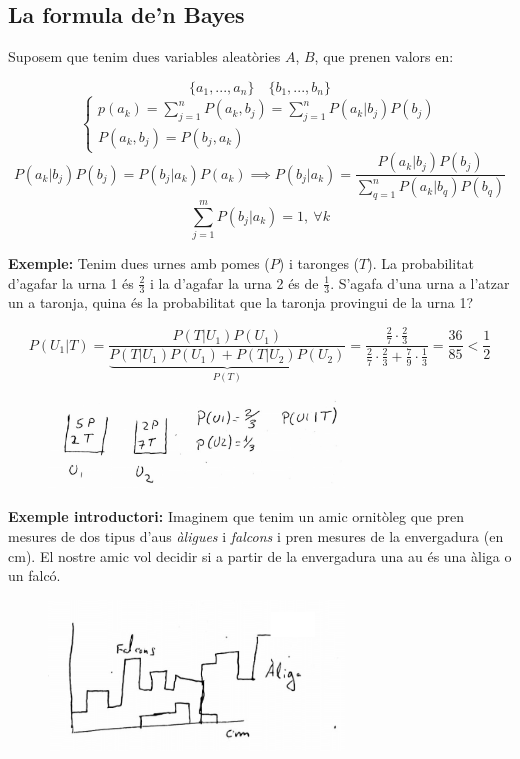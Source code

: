 \subsection{La formula de'n Bayes}

Suposem que tenim dues variables aleatòries $A$, $B$, que prenen valors en:

$$
\{ a_1, ..., a_n \}\quad \{ b_1, ..., b_n \}
$$
$$
\begin{cases}
p(a_k) = \sum_{j=1}^n P(a_k, b_j) = \sum_{j=1}^n P(a_k | b_j) P(b_j) \\
P(a_k, b_j) = P(b_j, a_k)
\end{cases}
$$
$$
P(a_k | b_j) P(b_j) = P(b_j | a_k) P(a_k) \implies
\boxed{P(b_j | a_k) = \frac{P(a_k | b_j) P(b_j)}{\sum_{q=1}^n P(a_k | b_q) P(b_q)}}
$$
$$
\sum_{j=1}^m P(b_j | a_k) = 1,\ \forall k 
$$

\textbf{Exemple:} Tenim dues urnes amb pomes ($P$) i taronges ($T$). La probabilitat d'agafar la urna 1 és $\frac{2}{3}$ i la d'agafar la urna 2 és de $\frac{1}{3}$. S'agafa d'una urna a l'atzar un a taronja, quina és la probabilitat que la taronja provingui de la urna 1?

$$
P(U_1|T) =  \frac{P(T|U_1) P(U_1)}{\underbrace{P(T|U_1)P(U_1) + P(T|U_2)P(U_2)}_{P(T)}} =
\frac{\frac{2}{7} · \frac{2}{3}}{\frac{2}{7}·\frac{2}{3} + \frac{7}{9}·\frac{1}{3}} =
\frac{36}{85} < \frac{1}{2}
$$

\begin{figure}[H]
	\centering
	\includegraphics[width=0.7\textwidth]{tema_5/images/tema_5-3}
\end{figure}

\textbf{Exemple introductori:} Imaginem que tenim un amic ornitòleg que pren mesures de dos tipus d'aus \emph{àligues} i \emph{falcons} i pren mesures de la envergadura (en cm). El nostre amic vol decidir si a partir de la envergadura una au és una àliga o un falcó. 

\begin{figure}[H]
	\centering
	\includegraphics[width=0.7\textwidth]{tema_5/images/tema_5-4}
\end{figure}

